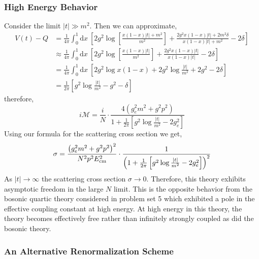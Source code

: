 \documentclass[12pt]{article}
\renewcommand{\d}[1]{ \mathrm{d}#1 \:}
\begin{document}
\subsubsection{High Energy Behavior}

Consider the limit $|t| \gg m^2$. Then we can approximate,
\begin{align*}
V(t) - Q & = \frac{1}{4 \pi} \int_0^1 \d{x} \left[ 2 g^2 \log \left[ \frac{x(1 - x) |t| + m^2}{m^2} \right] + \frac{2g^2 x(1-x) |t| + 2 m^2 \delta}{x(1-x) |t| + m^2} - 2 \delta \right]
\\
& \approx \frac{1}{4 \pi} \int_0^1 \d{x} \left[ 2 g^2 \log \left[ \frac{x(1 - x) |t|}{m^2} \right] + \frac{2g^2 x(1-x) |t| }{x(1-x) |t|} - 2 \delta \right]
\\
& = \frac{1}{4 \pi} \int_0^1 \d{x} \left[ 2 g^2 \log{x(1 - x)} + 2g^2 \log{ \frac{|t|}{m^2} } + 2 g^2 - 2 \delta \right]
\\
& = \frac{1}{2 \pi} \left[ g^2 \log{ \frac{|t|}{m^2} } - g^2 - \delta \right] 
\end{align*}
therefore,
\[ i \mathcal{M} = \frac{i}{N} \cdot \frac{ 4 \left( g_e^2 m^2 + g^2 p^2 \right) }{1 + \frac{1}{2 \pi} \left[ g^2 \log{ \frac{|t|}{m^2} } - 2 g_e^2 \right] } \]
Using our formula for the scattering cross section we get,
\[ \sigma = \frac{\left( g_e^2 m^2 + g^2 p^2 \right)^2}{N^2 p^2 E_{\mathrm{cm}}^2} \cdot \frac{1}{\left( 1 + \frac{1}{2 \pi} \left[ g^2 \log{ \frac{|t|}{m^2} } - 2 g_e^2 \right] \right)^2} \]
As $|t| \to \infty$ the scattering cross section $\sigma \to 0$. Therefore, this theory exhibits asymptotic freedom in the large $N$ limit. This is the opposite behavior from the bosonic quartic theory considered in problem set 5 which exhibited a pole in the effective coupling constant at high energy. At high energy in this theory, the theory becomes effectively free rather than infinitely strongly coupled as did the bosonic theory. 

\subsubsection{An Alternative Renormalization Scheme}
\end{document}
